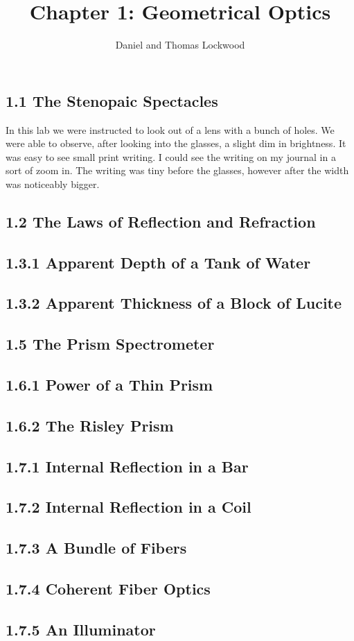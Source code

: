 \documentclass[12pt, oneside]{article}   	%
\title{Chapter 1: Geometrical Optics}
\author{Daniel and Thomas Lockwood}
\begin{document}
\maketitle{}
\subsection*{1.1 The Stenopaic Spectacles}
In this lab we were instructed to look out of a lens with a bunch of holes. We were able to observe, after looking into the glasses, a slight dim in brightness. It was easy to see small print writing. I could see the writing on my journal in a sort of zoom in. The writing was tiny before the glasses, however after the width was noticeably bigger. 

\subsection*{1.2 The Laws of Reflection and Refraction}


\subsection*{1.3.1 Apparent Depth of a Tank of Water}

\subsection*{1.3.2 Apparent Thickness of a Block of Lucite}

\subsection*{1.5 The Prism Spectrometer}

\subsection*{1.6.1 Power of a Thin Prism}

\subsection*{1.6.2 The Risley Prism}

\subsection*{1.7.1 Internal Reflection in a Bar}

\subsection*{1.7.2 Internal Reflection in a Coil}

\subsection*{1.7.3 A Bundle of Fibers}

\subsection*{1.7.4 Coherent Fiber Optics}

\subsection*{1.7.5 An Illuminator}
\end{document}
